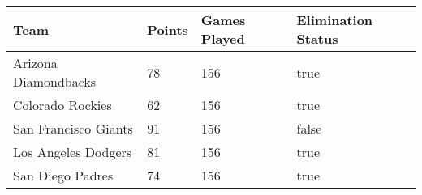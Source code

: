 \documentclass{report}
\begin{document}
\begin{tabular}{| l | l | l | l |}
\hline
Team & Points & Games Played & Elimination Status \\ \hline
Arizona Diamondbacks & 78 & 156 & true\\
Colorado Rockies & 62 & 156 & true\\
San Francisco Giants & 91 & 156 & false\\
Los Angeles Dodgers & 81 & 156 & true\\
San Diego Padres & 74 & 156 & true\\\hline
\end{tabular}\\ \\
\end{document}

